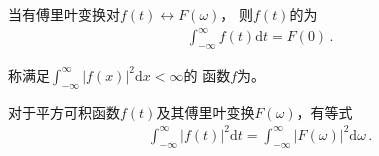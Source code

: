 \begin{theorem}
    当有傅里叶变换对$f(t)\leftrightarrow F(\omega)$，
    则$f(t)$的为
    \begin{align}
        \int_{-\infty}^{\infty}f(t)\mathrm{d}t=F(0)\, .
    \end{align}
\end{theorem}

\begin{definition}
    称满足$\displaystyle\int_{-\infty}^{\infty}|f(x)|^2\mathrm{d}x<\infty$的
    函数$f$为。
\end{definition}
\begin{theorem}
    对于平方可积函数$f(t)$及其傅里叶变换$F(\omega)$，有等式
    \begin{align}
        \int_{-\infty}^{\infty}|f(t)|^2\mathrm{d}t=\int_{-\infty}^{\infty}|F(\omega)|^2\mathrm{d}\omega\, .
    \end{align}
\end{theorem}
